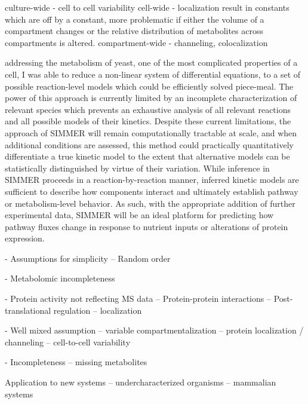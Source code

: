 culture-wide - cell to cell variability
cell-wide - localization result in constants which are off by a constant, more problematic if either the volume of a compartment changes or the relative distribution of metabolites across compartments is altered.
compartment-wide - channeling, colocalization




addressing the metabolism of yeast, one of the most complicated properties of a cell, I was able to reduce a non-linear system of differential equations, to a set of possible reaction-level models which could be efficiently solved piece-meal. The power of this approach is currently limited by an incomplete characterization of relevant species which prevents an exhaustive analysis of all relevant reactions and all possible models of their kinetics. Despite these current limitations, the approach of SIMMER will remain computationally tractable at scale, and when additional conditions are assessed, this method could practically quantitatively differentiate a true kinetic model to the extent that alternative models can be statistically distinguished by virtue of their variation. While inference in SIMMER proceeds in a reaction-by-reaction manner, inferred kinetic models are sufficient to describe how components interact and ultimately establish pathway or metabolism-level behavior. As such, with the appropriate addition of further experimental data, SIMMER will be an ideal platform for predicting how pathway fluxes change in response to nutrient inputs or alterations of protein expression.

- Assumptions for simplicity
-- Random order

- Metabolomic incompleteness


- Protein activity not reflecting MS data
-- Protein-protein interactions
-- Post-translational regulation
-- localization

- Well mixed assumption
-- variable compartmentalization
-- protein localization / channeling
-- cell-to-cell variability 

- Incompleteness
-- missing metabolites 

Application to new systems
-- undercharacterized organisms
-- mammalian systems





